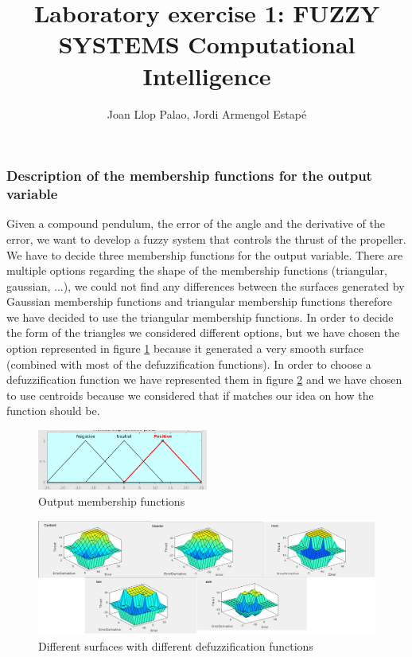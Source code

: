 \documentclass{article}[11pt]
\title{\vspace{-2.0cm}Laboratory exercise 1: FUZZY SYSTEMS
                        \bigskip
                        \LARGE{Computational Intelligence}}
\author{Joan Llop Palao, Jordi Armengol Estapé}
\date{}
\begin{document}
\maketitle

\subsubsection*{Description of the membership functions for the output variable}
Given a compound pendulum, the error of the angle and the derivative of the error, we want to develop a fuzzy system that controls the thrust of the propeller. We have to decide three membership functions for the output variable. There are multiple options regarding the shape of the membership functions (triangular, gaussian, ...), we could not find any differences between the surfaces generated by Gaussian membership functions and triangular membership functions therefore we have decided to use the triangular membership functions. In order to decide the form of the triangles we considered different options, but we have chosen the option represented in figure \ref{fig:output_function_1} because it generated a very smooth surface (combined with most of the defuzzification functions). In order to choose a defuzzification function we have represented them in figure \ref{fig:defuzzification} and we have chosen to use centroids because we considered that if matches our idea on how the function should be. 
\begin{figure}[htb!]
    \centering
    \includegraphics[width=0.5\textwidth]{img/output_variable_trinf_extended.png}
    \caption{Output membership functions}
    \label{fig:output_function_1}
\end{figure}
\begin{figure}[hbt!]
    \centering
    \centerline{\includegraphics[width=\textwidth]{img/defuzzification.png}}
    \caption{Different surfaces with different defuzzification functions}
    \label{fig:defuzzification}
\end{figure}
\end{document}
